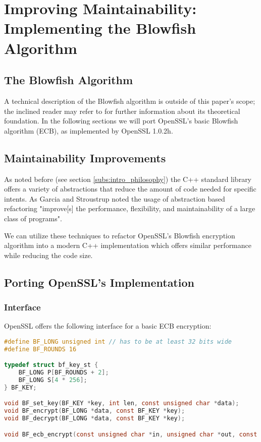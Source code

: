 \section{Improving Maintainability: Implementing the Blowfish Algorithm}

\subsection{The Blowfish Algorithm}
A technical description of the Blowfish algorithm is outside of this paper's scope; the inclined reader may refer to \cite{blowfish} for further information about its theoretical foundation. In the following sections we will port OpenSSL's basic Blowfish algorithm (ECB), as implemented by OpenSSL 1.0.2h. %

\subsection{Maintainability Improvements}

As noted before (see section \ref{subs:intro_philosophy}) the C++ standard library offers a variety of abstractions that reduce the amount of code needed for specific intents. As Garcia and Stroustrup noted the usage of abstraction based refactoring "improve[s] the performance, flexibility, and maintainability of a large class of programs"\cite{impperf}.

We can utilize these techniques to refactor OpenSSL's Blowfish encryption algorithm into a modern C++ implementation which offers similar performance while reducing the code size.

\subsection{Porting OpenSSL's Implementation}

\subsubsection{Interface}\label{subsub:bf_interface}

OpenSSL offers the following interface for a basic ECB encryption:

\begin{lstlisting}[language=C]
#define BF_LONG unsigned int // has to be at least 32 bits wide
#define BF_ROUNDS 16

typedef struct bf_key_st {
    BF_LONG P[BF_ROUNDS + 2];
    BF_LONG S[4 * 256];
} BF_KEY;

void BF_set_key(BF_KEY *key, int len, const unsigned char *data);
void BF_encrypt(BF_LONG *data, const BF_KEY *key);
void BF_decrypt(BF_LONG *data, const BF_KEY *key);

void BF_ecb_encrypt(const unsigned char *in, unsigned char *out, const BF_KEY *key, int enc);
\end{lstlisting}

